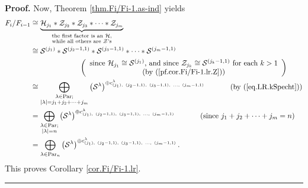 \documentclass[numbers=enddot,12pt,final,onecolumn,notitlepage]{scrartcl}%
\theoremstyle{definition}
\newenvironment{proof}[1][Proof]{\noindent\textbf{#1.} }{\ \rule{0.5em}{0.5em}}
\begin{document}
\begin{proof}
Now, Theorem \ref{thm.Fi/Fi-1.as-ind} yields%
\begin{align*}
F_{i}/F_{i-1}  &  \cong\underbrace{\mathcal{H}_{j_{1}}\ast\mathcal{Z}_{j_{2}%
}\ast\mathcal{Z}_{j_{3}}\ast\cdots\ast\mathcal{Z}_{j_{m}}}%
_{\substack{\text{the first factor is an }\mathcal{H}\text{,}\\\text{while all
others are }\mathcal{Z}\text{'s}}}\\
&  \cong\mathcal{S}^{\left(  j_{1}\right)  }\ast\mathcal{S}^{\left(
j_{2}-1,1\right)  }\ast\mathcal{S}^{\left(  j_{3}-1,1\right)  }\ast\cdots
\ast\mathcal{S}^{\left(  j_{m}-1,1\right)  }\\
&  \ \ \ \ \ \ \ \ \ \ \ \ \ \ \ \ \ \ \ \ \left(
\begin{array}
[c]{c}%
\text{since }\mathcal{H}_{j_{1}}\cong\mathcal{S}^{\left(  j_{1}\right)
}\text{, and since }\mathcal{Z}_{j_{k}}\cong\mathcal{S}^{\left(
j_{k}-1,1\right)  }\text{ for each }k>1\\
\text{(by (\ref{pf.cor.Fi/Fi-1.lr.Z}))}%
\end{array}
\right) \\
&  \cong\bigoplus_{\substack{\lambda\in\operatorname*{Par};\\\left\vert
\lambda\right\vert =j_{1}+j_{2}+\cdots+j_{m}}}\left(  \mathcal{S}^{\lambda
}\right)  ^{\oplus c_{\left(  j_{1}\right)  ,\ \left(  j_{2}-1,1\right)
,\ \left(  j_{3}-1,1\right)  ,\ \ldots,\ \left(  j_{m}-1,1\right)  }^{\lambda
}}\ \ \ \ \ \ \ \ \ \ \left(  \text{by (\ref{eq.LR.kSpecht})}\right) \\
&  =\bigoplus_{\substack{\lambda\in\operatorname*{Par};\\\left\vert
\lambda\right\vert =n}}\left(  \mathcal{S}^{\lambda}\right)  ^{\oplus
c_{\left(  j_{1}\right)  ,\ \left(  j_{2}-1,1\right)  ,\ \left(
j_{3}-1,1\right)  ,\ \ldots,\ \left(  j_{m}-1,1\right)  }^{\lambda}%
}\ \ \ \ \ \ \ \ \ \ \left(  \text{since }j_{1}+j_{2}+\cdots+j_{m}=n\right) \\
&  =\bigoplus_{\lambda\in\operatorname*{Par}\nolimits_{n}}\left(
\mathcal{S}^{\lambda}\right)  ^{\oplus c_{\left(  j_{1}\right)  ,\ \left(
j_{2}-1,1\right)  ,\ \left(  j_{3}-1,1\right)  ,\ \ldots,\ \left(
j_{m}-1,1\right)  }^{\lambda}}.
\end{align*}
This proves Corollary \ref{cor.Fi/Fi-1.lr}.
\end{proof}

\end{document}
